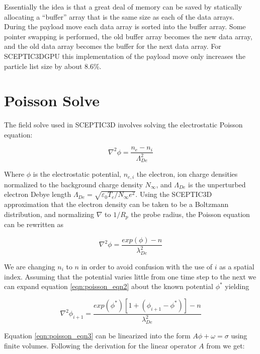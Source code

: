 		Essentially the idea is that a great deal of memory can be saved by statically allocating a ``buffer'' array that is the same size as each of the data arrays. During the payload move each data array is sorted into the buffer array. Some pointer swapping is performed, the old buffer array becomes the new data array, and the old data array becomes the buffer for the next data array. For SCEPTIC3DGPU this implementation of the payload move only increases the particle list size by about 8.6\%.



	\section{Poisson Solve}
The field solve used in SCEPTIC3D involves solving the electrostatic Poisson equation:

\begin{equation}
\nabla^2\phi=\frac{n_e-n_i}{\Lambda_{De}^2}
\label{eqn:poisson_eqn1}
\end{equation}

Where $\phi$ is the electrostatic potential, $n_{e,i}$ the electron, ion charge densities normalized to the background charge density $N_\infty$, and $\Lambda_{De}$ is the unperturbed electron Debye length $\Lambda_{De} = \sqrt{\varepsilon_0T_e/N_\infty e^2}$. Using the SCEPTIC3D approximation that the electron density can be taken to be a Boltzmann distribution, and normalizing $\nabla$ to $1/R_p$ the probe radius, the Poisson equation can be rewritten as 

\begin{equation}
\nabla^2\phi=\frac{exp(\phi)-n}{\lambda_{De}^2}
\label{eqn:poisson_eqn2}
\end{equation}

We are changing $n_i$ to $n$ in order to avoid confusion with the use of $i$ as a spatial index. Assuming that the potential varies little from one time step to the next we can expand equation \ref{eqn:poisson_eqn2} about the known potential $\phi^*$ yielding
   
\begin{equation}
\nabla^2\phi_{i+1}=\frac{exp(\phi^*)[1+(\phi_{i+1}-\phi^*)]-n}{\lambda_{De}^2}
\label{eqn:poisson_eqn3}
\end{equation}

Equation \ref{eqn:poisson_eqn3} can be linearized into the form $A\phi+\omega = \sigma$ using finite volumes. Following the derivation for the linear operator $A$ from \cite{Patacchini2010} we get:


